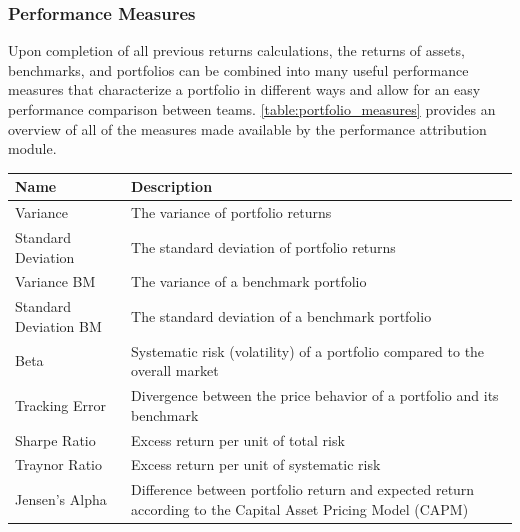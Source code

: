 \subsubsection{Performance Measures}
Upon completion of all previous returns calculations, the returns of assets, benchmarks, and portfolios can be combined into many useful performance measures that characterize a portfolio in different ways and allow for an easy performance comparison between teams. \cref{table:portfolio_measures} provides an overview of all of the measures made available by the performance attribution module.

\begin{table}[h!]
    \begin{tabular}{lp{9cm}}
        \toprule
        Name                              & Description                                                                                                 \\
        \midrule
        Variance                          & The variance of portfolio returns                                                                           \\
        Standard Deviation                & The standard deviation of portfolio returns                                                                 \\
        Variance BM                       & The variance of a benchmark portfolio                                                                       \\
        Standard Deviation BM             & The standard deviation of a benchmark portfolio                                                             \\
        Beta                              & Systematic risk (volatility) of a portfolio compared to the overall market                                  \\
        Tracking Error                    & Divergence between the price behavior of a portfolio and its benchmark                                      \\
        Sharpe Ratio                      & Excess return per unit of total risk                                                                        \\
        Traynor Ratio                     & Excess return per unit of systematic risk                                                                   \\
        Jensen's Alpha                    & Difference between portfolio return and expected return according to the Capital Asset Pricing Model (CAPM) \\

\end{tabular}
\end{table}
